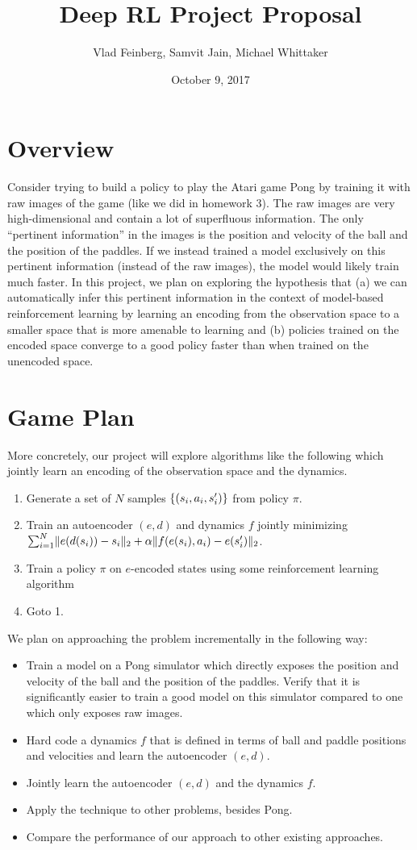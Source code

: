 \documentclass{report}
\title{Deep RL Project Proposal}
\author{Vlad Feinberg, Samvit Jain, Michael Whittaker}
\date{October 9, 2017}
\begin{document}
\maketitle{}

\section*{Overview}
Consider trying to build a policy to play the Atari game Pong by training it
with raw images of the game (like we did in homework 3). The raw images are
very high-dimensional and contain a lot of superfluous information. The only
``pertinent information'' in the images is the position and velocity of the
ball and the position of the paddles. If we instead trained a model exclusively
on this pertinent information (instead of the raw images), the model would
likely train much faster. In this project, we plan on exploring the hypothesis
that (a) we can automatically infer this pertinent information in the context of
model-based reinforcement learning by learning an encoding from the observation
space to a smaller space that is more amenable to learning and (b) policies
trained on the encoded space converge to a good policy faster than when trained
on the unencoded space.

\section*{Game Plan}
More concretely, our project will explore algorithms like the following which
jointly learn an encoding of the observation space and the dynamics.
\begin{enumerate}
  \item
    Generate a set of $N$ samples $\{(s_i, a_i, s_i')\}$ from policy $\pi$.
  \item
    Train an autoencoder $(e, d)$ and dynamics $f$ jointly minimizing
    $\sum_{i=1}^N \lVert e(d(s_i)) - s_i\rVert_2 + \alpha \lVert f(e(s_i), a_i) -
    e(s_i')\rVert_2$.
  \item
    Train a policy $\pi$ on $e$-encoded states using some reinforcement
    learning algorithm
  \item
    Goto 1.
\end{enumerate}
We plan on approaching the problem incrementally in the following way:
\begin{itemize}
  \item
    Train a model on a Pong simulator which directly exposes the position and
    velocity of the ball and the position of the paddles. Verify that it is
    significantly easier to train a good model on this simulator compared to
    one which only exposes raw images.
  \item
    Hard code a dynamics $f$ that is defined in terms of ball and paddle
    positions and velocities and learn the autoencoder $(e, d)$.
  \item
    Jointly learn the autoencoder $(e, d)$ and the dynamics $f$.
  \item
    Apply the technique to other problems, besides Pong.
  \item
    Compare the performance of our approach to other existing approaches.
\end{itemize}
\end{document}
